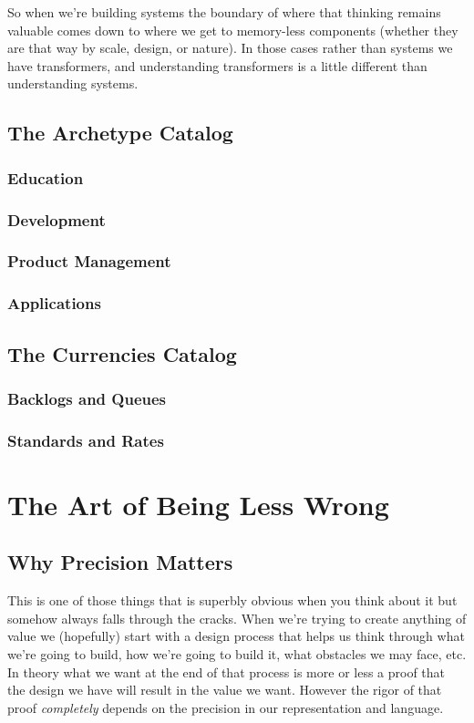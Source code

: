 \documentclass[11pt,a5paper]{book}
\begin{document}
So when we're building systems the boundary of where that thinking remains valuable comes down to where we get to memory-less components (whether they are that way by scale, design, or nature). In those cases rather than systems we have transformers, and understanding transformers is a little different than understanding systems.

\section{The Archetype Catalog}
\subsection{Education}
\subsection{Development}
\subsection{Product Management}
\subsection{Applications}

\section{The Currencies Catalog}
\subsection{Backlogs and Queues}
\subsection{Standards and Rates}

\chapter{The Art of Being Less Wrong}  
\section{Why Precision Matters}
This is one of those things that is superbly obvious when you think about it but somehow always falls through the cracks. When we're trying to create anything of value we (hopefully) start with a design process that helps us think through what we're going to build, how we're going to build it, what obstacles we may face, etc. In theory what we want at the end of that process is more or less a proof that the design we have will result in the value we want. However the rigor of that proof \textit{completely} depends on the precision in our representation and language. 
\newline
\end{document}
